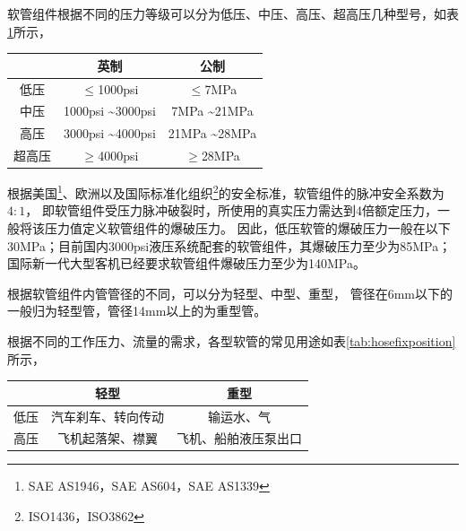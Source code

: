 


软管组件根据不同的压力等级可以分为低压、中压、高压、超高压几种型号，如表\ref{tab:hosepressurelevle}所示，


\begin{table}[!htbp]
	\centering
	\label{tab:hosepressurelevle}
	\begin{tabular}{ccc}
		\toprule
		    &   英制    &  公制  \\ \midrule
		低压  & $ \le$1000psi  & $ \le$7MPa \\
		中压  &  1000psi   \textasciitilde  3000psi  & 7MPa   \textasciitilde  21MPa \\
		高压  &  3000psi   \textasciitilde  4000psi &  21MPa   \textasciitilde  28MPa\\
		超高压 & $ \ge$4000psi &  $ \ge$28MPa  \\ \bottomrule
	\end{tabular} 
\end{table}

根据美国\footnote{SAE AS1946，SAE AS604，SAE AS1339}、欧洲以及国际标准化组织\footnote{ISO1436，ISO3862
}的安全标准，软管组件的脉冲安全系数为$ 4:1 $，
即软管组件受压力脉冲破裂时，所使用的真实压力需达到4倍额定压力，一般将该压力值定义软管组件的爆破压力。
因此，低压软管的爆破压力一般在以下30MPa；目前国内3000psi液压系统配套的软管组件，其爆破压力至少为85MPa；国际新一代大型客机已经要求软管组件爆破压力至少为140MPa。


根据软管组件内管管径的不同，可以分为轻型、中型、重型，
管径在6mm以下的一般归为轻型管，管径14mm以上的为重型管。

根据不同的工作压力、流量的需求，各型软管的常见用途如表\ref{tab:hosefixposition}所示，

\begin{table}[!htbp]
	\centering
		
	\begin{tabular}{ccc}
		\toprule
		&    轻型     &     重型     \\ \hline
		低压 & 汽车刹车、转向传动 &  输运水、气  \\
		高压 & 飞机起落架、襟翼  & 飞机、船舶液压泵出口 \\ 
		\bottomrule
	\end{tabular} 
\end{table}

